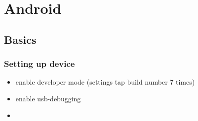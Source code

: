 \chapter{Android}
    \section{Basics}
    
        \subsection{Setting up device}
            \begin{itemize}
                \item enable developer mode (settings tap build number 7 times)
                \item enable usb-debugging
                \item 
            \end{itemize}